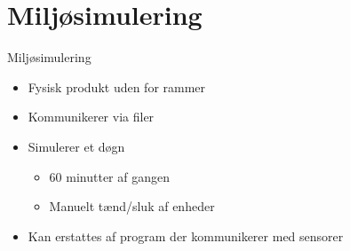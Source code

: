 \section{Miljøsimulering}
\begin{frame}{Miljøsimulering}{}
\begin{itemize}
	\item Fysisk produkt uden for rammer
	\item Kommunikerer via filer
	\item Simulerer et døgn
	\begin{itemize}
		\item 60 minutter af gangen
		\item Manuelt tænd/sluk af enheder
	\end{itemize}
	\item Kan erstattes af program der kommunikerer med sensorer
\end{itemize}
\end{frame}